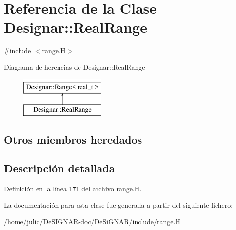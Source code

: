 \hypertarget{class_designar_1_1_real_range}{}\section{Referencia de la Clase Designar\+:\+:Real\+Range}
\label{class_designar_1_1_real_range}


{\ttfamily \#include $<$range.\+H$>$}

Diagrama de herencias de Designar\+:\+:Real\+Range\begin{figure}[H]
\begin{center}
\leavevmode
\includegraphics[height=2.000000cm]{class_designar_1_1_real_range}
\end{center}
\end{figure}
\subsection*{Otros miembros heredados}


\subsection{Descripción detallada}


Definición en la línea 171 del archivo range.\+H.



La documentación para esta clase fue generada a partir del siguiente fichero\+:\begin{DoxyCompactItemize}
\item 
/home/julio/\+De\+S\+I\+G\+N\+A\+R-\/doc/\+De\+Si\+G\+N\+A\+R/include/\hyperlink{range_8_h}{range.\+H}\end{DoxyCompactItemize}
